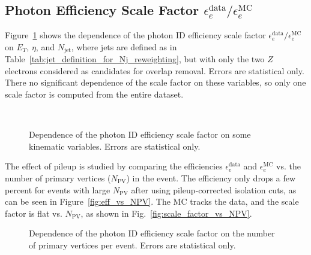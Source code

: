 \documentclass[dissertation.tex]{subfiles}
\begin{document}
\subsection{Photon Efficiency Scale Factor $\epsilon_{e}^{\mathrm{data}}/\epsilon_{e}^{\mathrm{MC}}$}
\label{sec:Photon_Efficiency_Scale_Factor}

Figure~\ref{fig:scale_factors} shows the dependence of the photon ID efficiency scale factor $\epsilon_{e}^{\mathrm{data}}/\epsilon_{e}^{\mathrm{MC}}$ on $E_{T}$, $\eta$, and $N_{\mathrm{jet}}$, where jets are defined as in Table~\ref{tab:jet_definition_for_Nj_reweighting}, but with only the two $Z$ electrons considered as candidates for overlap removal.  Errors are statistical only.  There no significant dependence of the scale factor on these variables, so only one scale factor is computed from the entire dataset.

\begin{figure}
	\centering
	\hspace{1cm}
	\\
	\caption{Dependence of the photon ID efficiency scale factor on some kinematic variables.  Errors are statistical only.}
	\label{fig:scale_factors}
\end{figure}

The effect of pileup is studied by comparing the efficiencies $\epsilon_{e}^{\mathrm{data}}$ and $\epsilon_{e}^{\mathrm{MC}}$ vs. the number of primary vertices ($N_{\mathrm{PV}}$) in the event.  The efficiency only drops a few percent for events with large $N_{\mathrm{PV}}$ after using pileup-corrected isolation cuts, as can be seen in Figure~\ref{fig:eff_vs_NPV}.  The MC tracks the data, and the scale factor is flat vs. $N_{\mathrm{PV}}$, as shown in Fig.~\ref{fig:scale_factor_vs_NPV}.

\begin{figure}
	\centering
	\hspace{1cm}
	\caption{Dependence of the photon ID efficiency scale factor on the number of primary vertices per event.  Errors are statistical only.}
	\label{fig:vs_NPV}
\end{figure}
\end{document}
